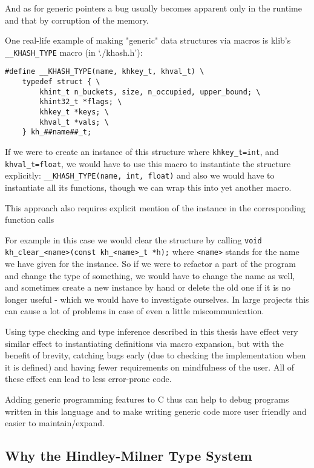 And as for generic pointers a bug usually becomes apparent only in the runtime and that by corruption of the memory.

One real-life example of making "generic" data structures via macros is klib's \lstinline{__KHASH_TYPE} macro (in `./khash.h'): %

\begin{lstlisting}
#define __KHASH_TYPE(name, khkey_t, khval_t) \
	typedef struct { \
		khint_t n_buckets, size, n_occupied, upper_bound; \
		khint32_t *flags; \
		khkey_t *keys; \
		khval_t *vals; \
	} kh_##name##_t;
\end{lstlisting}

If we were to create an instance of this structure where \lstinline{khkey_t=int}, and \lstinline{khval_t=float},
we would have to use this macro to instantiate the structure explicitly:
\lstinline{__KHASH_TYPE(name, int, float)} and also we would have to instantiate all its functions, though we can wrap this into yet another macro.

This approach also requires explicit mention of the instance in the corresponding function calls

For example in this case we would clear the structure by calling
\lstinline{void kh_clear_<name>(const kh_<name>_t *h);} where \lstinline{<name>} stands for the name we have given for the instance. So if we were to refactor a part of the program and change the type of something, we would have to change the name as well, and sometimes create a new instance by hand or delete the old one if it is no longer useful - which we would have to investigate ourselves. In large projects this can cause a lot of problems in case of even a little miscommunication.

Using type checking and type inference described in this thesis have effect very similar effect to instantiating definitions via macro expansion, but with the benefit of brevity, catching bugs early (due to checking the implementation when it is defined) and having fewer requirements on mindfulness of the user. All of these effect can lead to less error-prone code.

Adding generic programming features to C thus can help to debug programs written in this language and to make writing generic code more user friendly and easier to maintain/expand. %

\subsection{Why the Hindley-Milner Type System}

